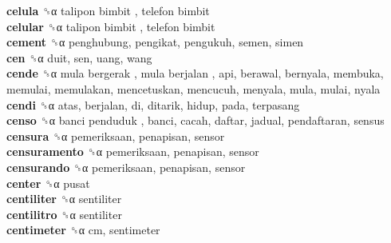 \textbf{celula} ␝α   talipon bimbit ,  telefon bimbit   \\
\textbf{celular} ␝α   talipon bimbit ,  telefon bimbit   \\
\textbf{cement} ␝α  penghubung, pengikat, pengukuh, semen, simen  \\
\textbf{cen} ␝α  duit, sen, uang, wang  \\
\textbf{cende} ␝α   mula bergerak ,  mula berjalan , api, berawal, bernyala, membuka, memulai, memulakan, mencetuskan, mencucuh, menyala, mula, mulai, nyala  \\
\textbf{cendi} ␝α  atas, berjalan, di, ditarik, hidup, pada, terpasang  \\
\textbf{censo} ␝α   banci penduduk , banci, cacah, daftar, jadual, pendaftaran, sensus  \\
\textbf{censura} ␝α  pemeriksaan, penapisan, sensor  \\
\textbf{censuramento} ␝α  pemeriksaan, penapisan, sensor  \\
\textbf{censurando} ␝α  pemeriksaan, penapisan, sensor  \\
\textbf{center} ␝α  pusat  \\
\textbf{centiliter} ␝α  sentiliter  \\
\textbf{centilitro} ␝α  sentiliter  \\
\textbf{centimeter} ␝α  cm, sentimeter  \\

